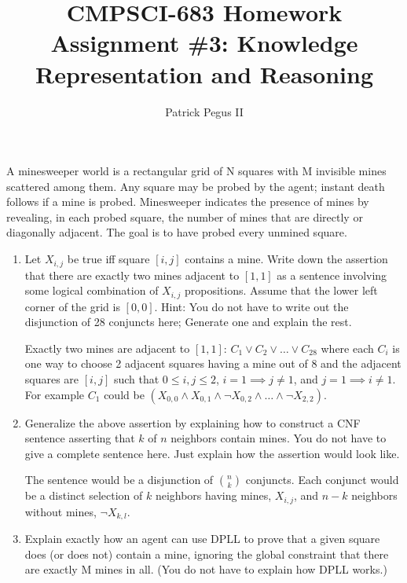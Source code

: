 \documentclass[12pt]{article}
\newenvironment{problem}[2][Problem]{\begin{trivlist}
\item[\hskip \labelsep {\bfseries #1}\hskip \labelsep {\bfseries #2.}]}{\end{trivlist}}
\begin{document}

\title{CMPSCI-683 Homework Assignment \#3: Knowledge Representation and Reasoning}
\author{Patrick Pegus II}
\maketitle

\begin{problem}{1}
	A minesweeper world is a rectangular grid of N squares with M invisible mines scattered among them.
	Any square may be probed by the agent; instant death follows if a mine is probed.
	Minesweeper indicates the presence of mines by revealing, in each probed square, the number of mines that are directly or diagonally adjacent.
	The goal is to have probed every unmined square.
	\begin{enumerate}
		\item Let $X_{i,j}$ be true iff square $[i,j]$ contains a mine.
			Write down the assertion that there are exactly two mines adjacent to $[1,1]$ as a sentence involving some logical combination of $X_{i,j}$ propositions.
			Assume that the lower left corner of the grid is $[0,0]$.
			Hint: You do not have to write out the disjunction of 28 conjuncts here; Generate one and explain the rest.

			\vspace{0.25cm}
			Exactly two mines are adjacent to $[1,1]$: $C_1 \vee C_2 \vee \dots \vee C_{28}$ where each $C_i$ is one
			way to choose 2 adjacent squares having a mine out of 8 and the adjacent squares are
			$[i,j]$ such that $0 \le i,j \le 2$, $i=1 \implies j \neq 1$, and $j=1 \implies i \neq 1$.
			For example $C_1$ could be $\left(X_{0,0} \wedge X_{0,1} \wedge \neg X_{0,2} \wedge \dots \wedge \neg X_{2,2}\right)$.
		\item Generalize the above assertion by explaining how to construct a CNF sentence asserting that $k$ of $n$ neighbors contain mines.
			You do not have to give a complete sentence here.
			Just explain how the assertion would look like.

			\vspace{0.25cm}
			The sentence would be a disjunction of ${{n}\choose{k}}$ conjuncts.
			Each conjunct would be a distinct selection of $k$ neighbors having mines, $X_{i,j}$,
			and $n-k$ neighbors without mines, $\neg X_{k,l}$.
		\item Explain exactly how an agent can use DPLL to prove that a given square does (or does not) contain a mine,
			ignoring the global constraint that there are exactly M mines in all.
			(You do not have to explain how DPLL works.)

			\vspace{0.25cm}
	\end{enumerate}
\end{problem}
\end{document}
